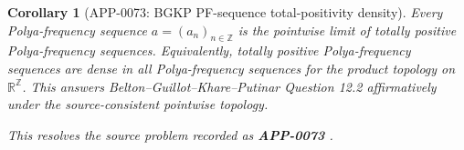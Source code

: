 \documentclass[11pt]{article}
\numberwithin{equation}{section}
\newtheorem{corollary}[theorem]{Corollary}
\theoremstyle{definition}
\theoremstyle{remark}
\newcommand{\1}{\mathbf 1}
\begin{document}
\begin{corollary}[APP-0073: BGKP PF-sequence total-positivity density]
\label{res:pfseq-tp-density-discretegaussian}
Every Polya-frequency sequence \(a=(a_n)_{n\in\mathbb Z}\) is the pointwise limit of totally positive Polya-frequency sequences. Equivalently, totally positive Polya-frequency sequences are dense in all Polya-frequency sequences for the product topology on \(\mathbb R^{\mathbb Z}\). This answers Belton--Guillot--Khare--Putinar Question 12.2 affirmatively under the source-consistent pointwise topology.



This resolves the source problem recorded as \textbf{APP-0073} \cite{app-app-0073-source}.
\end{corollary}
\end{document}
